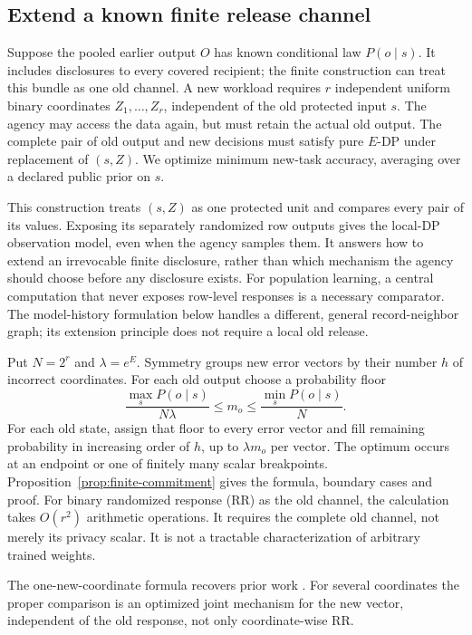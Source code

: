 \subsection{Extend a known finite release channel}
\label{sec:commitment}
Suppose the pooled earlier output $O$ has known conditional law
$P(o\mid s)$. It includes disclosures to every covered recipient;
the finite construction can treat this bundle as one old channel.
A new workload requires $r$ independent uniform binary coordinates
$Z_1,\ldots,Z_r$, independent of the old protected input $s$.
The agency may access the data again, but must retain the actual old
output. The complete pair of old output and new decisions must satisfy
pure $E$-DP under replacement of $(s,Z)$. We optimize minimum new-task
accuracy, averaging over a declared public prior on $s$.

This construction treats $(s,Z)$ as one protected unit and compares
every pair of its values. Exposing its separately randomized row outputs
gives the local-DP observation model, even when the agency samples them.
It answers how to extend an irrevocable finite disclosure, rather than
which mechanism the agency should choose before any disclosure exists.
For population learning, a central computation that never exposes
row-level responses is a necessary comparator. The model-history
formulation below handles a different, general record-neighbor graph;
its extension principle does not require a local old release.

Put $N=2^r$ and $\lambda=e^E$. Symmetry groups new error vectors by
their number $h$ of incorrect coordinates. For each old output choose
a probability floor
\[
 \frac{\max_sP(o\mid s)}{N\lambda}
 \le m_o\le \frac{\min_sP(o\mid s)}N.
\]
For each old state, assign that floor to every error vector and fill
remaining probability in increasing order of $h$, up to $\lambda m_o$
per vector. The optimum occurs at an endpoint or one of finitely many
scalar breakpoints. Proposition~\ref{prop:finite-commitment} gives the
formula, boundary cases and proof. For binary randomized response (RR)
as the old channel, the calculation takes $O(r^2)$ arithmetic operations.
It requires the complete old channel, not merely its privacy scalar.
It is not a tractable characterization of arbitrary trained weights.

The one-new-coordinate formula recovers prior work
\citep{yamamoto2024privacyoptimized}. For several coordinates the
proper comparison is an optimized joint mechanism for the new vector,
independent of the old response, not only coordinate-wise RR.
